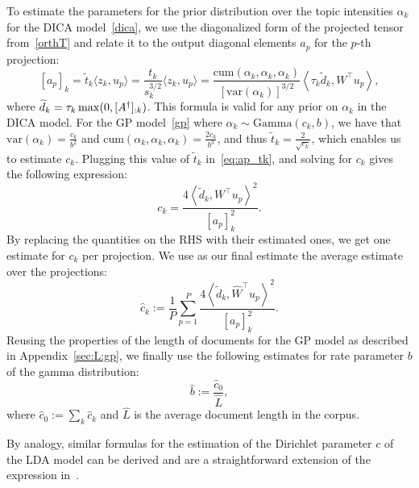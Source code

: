 \documentclass{article}
\def\max{\mathop{\rm max}\limits}
\newcommand{\inner}[1]{\left\langle#1\right\rangle}
\newcommand{\innerp}[1]{\langle#1\rangle}
\newcommand{\wt}[1]{\widetilde{#1}}
\newcommand{\wh}[1]{\widehat{#1}}
\newcommand{\pinv}{^{\dagger}}
\newcommand{\ga}{\alpha}
\newcommand{\var}{\mathrm{var}}
\newcommand{\cum}{\mathrm{cum}}
\newcommand{\gam}{\mathrm{Gamma}}
\begin{document}
To estimate the parameters for the prior distribution over the topic intensities $\ga_k$ for the DICA model~\eqref{dica}, we use the diagonalized form of the projected tensor from~\eqref{orthT} and relate it to the output diagonal elements $a_p$ for the $p$-th projection:
\begin{equation} \label{eq:ap_tk}
[a_p]_k = \wt{t}_k \innerp{z_k,u_p} = \frac{t_k}{s_k^{3/2}}  \innerp{z_k,u_p} =
\frac{\cum(\ga_k,\ga_k,\ga_k)}{[\var(\ga_k)]^{3/2}} \inner{\tau_k\wt{d}_k,W^{\top}u_p},
\end{equation}
where $\wt{d}_k = \tau_k \max(0,[A\pinv]_{:k})$.
This formula is valid for any prior on $\ga_k$ in the DICA model. For the GP model~\eqref{gp} where $\ga_k \sim \gam(c_k,b)$, we have that $\var(\ga_k) = \frac{c_k}{b^2}$ and  $\cum(\ga_k,\ga_k,\ga_k) = \frac{2 c_k}{b^3}$, and thus $ \wt{t}_k  = \frac{2}{\sqrt{c_k}}$, which enables us to estimate $c_k$. Plugging this value of $\wt{t}_k$ in~\eqref{eq:ap_tk}, and solving for $c_k$ gives the following expression:
$$
c_k = \frac{4 \inner{\wt{d}_k,W^{\top}u_p}^2}{[a_p]_k^2}.
$$
By replacing the quantities on the RHS with their estimated ones, we get one estimate for $c_k$ per projection. We use as our final estimate the average estimate over the projections:
\begin{equation} \label{eq:ck_estimate}
\wh{c}_k := \frac{1}{P} \sum_{p=1}^P  \frac{4 \inner{\wt{d}_k,\wh{W}^{\top}u_p}^2}{[a_p]_k^2}.
\end{equation}
Reusing the properties of the length of documents for the GP model as described in Appendix~\ref{sec:L:gp}, we finally use the following estimates for rate parameter $b$ of the gamma distribution:
\begin{equation} \label{eq:b_estimate}
 \wh{b} := \frac{\wh{c}_0} {\wh{L}},
\end{equation}
where $\wh{c}_0 := \sum_k \wh{c}_k$ and $\wh{L}$ is the average document length in the corpus.

By analogy, similar formulas for the estimation of the Dirichlet parameter $c$ of the LDA model can be derived and are a straightforward extension of the expression in~\cite{AnaEtAl2012}.
\end{document}
